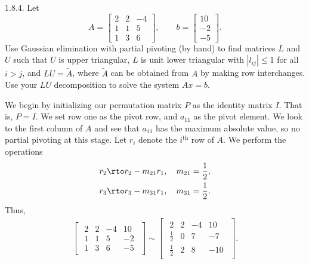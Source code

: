 \documentclass{report}
\begin{document}
    \bigbreak \noindent 
    \begin{mdframed}
        1.8.4. Let 
        \[
            A = 
            \begin{bmatrix}
                2 & 2 & -4 \\
                1 & 1 & 5 \\
                1 & 3 & 6
            \end{bmatrix},
            \qquad
            b =
            \begin{bmatrix}
                10 \\
                -2 \\
                -5
            \end{bmatrix}.
        \]
        Use Gaussian elimination with partial pivoting (by hand) to find matrices $L$ and $U$ such that $U$ is upper triangular, $L$ is unit lower triangular with $|l_{ij}| \leq 1$ for all $i > j$, and $LU = \tilde{A}$, where $\tilde{A}$ can be obtained from $A$ by making row interchanges. Use your $LU$ decomposition to solve the system $Ax = b$.
    \end{mdframed}
    \bigbreak \noindent 
    We begin by initializing our permutation matrix $P$ as the identity matrix $I$. That is, $P = I$. We set row one as the pivot row, and $a_{11}$ as the pivot element. We look to the first column of $A$ and see that $a_{11}$ has the maximum absolute value, so no partial pivoting at this stage.
    \bigbreak \noindent 
    Let $r_{i}$ denote the $i^{\text{th}}$ row of $A$. We perform the operations
    \begin{align*}
        &r_{2} \rto r_{2} - m_{21}r_{1}, \quad m_{21} = \frac{1}{2}, \\
        &r_{3} \rto r_{3} - m_{31}r_{1}, \quad m_{31} = \frac{1}{2}
    .\end{align*}
    Thus,
    \begin{align*}
        \begin{bmatrix}
            \begin{array}{ccc|c}
                2 & 2 & -4 & 10 \\
                1 & 1 & 5 & -2 \\
                1 & 3 & 6 & -5
            \end{array}
        \end{bmatrix}
        \sim
        \begin{bmatrix}
            \begin{array}{ccc|c}
                2 & 2 & -4 & 10 \\
                \boxed{\frac{1}{2}} & 0 & 7 & -7 \\
                \boxed{\frac{1}{2}}& 2 & 8 & -10
           \end{array}
        \end{bmatrix}
    .\end{align*}
\end{document}
